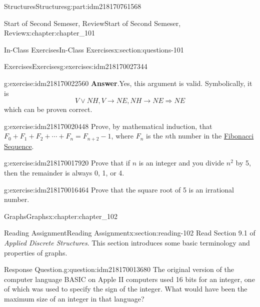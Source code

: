 \documentclass[oneside,10pt,]{book}
\newcommand{\blocktitlefont}{\relax}
\numberwithin{equation}{section}
\begin{document}
\begin{partptx}{Structures}{}{Structures}{}{}{g:part:idm218170761568}
\begin{chapterptx}{Start of Second Semeser, Review}{}{Start of Second Semeser, Review}{}{}{x:chapter:chapter_101}
\begin{sectionptx}{In-Class Exercises}{}{In-Class Exercises}{}{}{x:section:questions-101}
\begin{exercises-subsection-numberless}{Exercises}{}{Exercises}{}{}{g:exercises:idm218170027344}
\begin{exercisegroup}
\begin{divisionexerciseeg}{3}{}{}{g:exercise:idm218170022560}
\noindent\textbf{\blocktitlefont Answer}.\hypertarget{g:answer:idm218170022048}{}\quad{}Yes, this argument is valid.  Symbolically, it is%
\begin{equation*}
V \lor NH, V\rightarrow NE, NH\rightarrow NE \Rightarrow NE
\end{equation*}
which can be proven correct.%
\end{divisionexerciseeg}%
\begin{divisionexerciseeg}{4}{}{}{g:exercise:idm218170020448}%
Prove, by mathematical induction, that \(F_0 + F_1 + F_2 + \cdots + F_{n} = F_{n+2} - 1\), where \(F_n\) is the \(n\)th number in the \hyperref[x:section:def-fibonacci-sequence]{Fibonacci Sequence}.%
\end{divisionexerciseeg}%
\begin{divisionexerciseeg}{5}{}{}{g:exercise:idm218170017920}%
Prove that if \(n\) is an integer and you divide \(n^2\) by 5, then the remainder is always 0, 1, or 4.%
\end{divisionexerciseeg}%
\begin{divisionexerciseeg}{6}{}{}{g:exercise:idm218170016464}%
Prove that the square root of 5 is an irrational number.%
\end{divisionexerciseeg}%
\end{exercisegroup}
\par\medskip\noindent
\end{exercises-subsection-numberless}
\end{sectionptx}
\end{chapterptx}
%
\typeout{************************************************}
\typeout{************************************************}
%
\begin{chapterptx}{Graphs}{}{Graphs}{}{}{x:chapter:chapter_102}
%
%
%
\typeout{************************************************}
\typeout{************************************************}
%
\begin{sectionptx}{Reading Assignment}{}{Reading Assignment}{}{}{x:section:reading-102}
Read Section 9.1 of \emph{Applied Discrete Structures}. This section introduces some basic terminology and properties of graphs.%
\begin{question}{Response Question.}{g:question:idm218170013680}%
The original version of the computer language BASIC on Apple II computers used 16 bits for an integer, one of which was used to specify the sign of the integer.  What would have been the maximum size of an integer in that language?%

\end{question}
\end{sectionptx}
\end{chapterptx}
\end{partptx}
\end{document}
